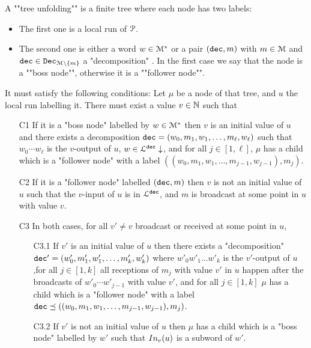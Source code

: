 \begin{definition}
	A ""tree unfolding"" is
	a finite tree where each node has two labels:
	\begin{itemize}
		\item The first one is a local run of $\mathcal{P}$. 
		
		\item The second one is either a word $w \in \mathcal{M}^*$ or a pair $(\mathtt{dec}, m)$ with $m \in \mathcal{M}$ and $\mathtt{dec} \in \mathtt{Dec}_{\mathcal{M}\setminus\{m\}}$ a "decomposition" . In the first case we say that the node is a ""boss node"", otherwise it is a ""follower node"". 
	\end{itemize} 
	
	It must satisfy the following conditions:
	Let $\mu$ be a node of that tree, and $u$ the local run labelling it. There must exist a value $v \in \mathbb{N}$ such that
	
	\begin{itemize}
		\item[C1] If it is a "boss node" labelled by $w \in \mathcal{M}^*$ then $v$ is an initial value of $u$ and there exists a decomposition $\mathtt{dec} = (w_0, m_1, w_1, \ldots, m_{\ell}, w_{\ell})$ such that
	 $w_0 \cdots w_\ell$ is the $v$-output of $u$, $w \in \mathcal{L}^{\mathtt{\mathtt{dec}}}\downarrow$, and for all $j \in [1,\ell]$, $\mu$ has a child which is a "follower node" with a label $((w_0, m_1, w_1, \ldots, m_{j-1}, w_{j-1}), m_j)$.
		
		\item[C2] If it is a "follower node" labelled $(\mathtt{dec}, m)$ then $v$ is not an initial value of $u$ such that the $v$-input of $u$ is in $\mathcal{L}^{\mathtt{\mathtt{dec}}}$, and $m$ is broadcast at some point in $u$ with value $v$.
		
		\item[C3] In both cases, for all $v' \neq v$ broadcast or received at some point in $u$,
		\begin{itemize}
			\item[C3.1] If $v'$ is an initial value of $u$ then there exists a "decomposition" $\mathtt{dec}' = (w'_0, m'_1, w'_1, \ldots, m'_k, w'_k)$ where $w'_0 w'_1 \ldots w'_k$ is the $v'$-output of $u$,for all $j \in [1,k]$ all receptions of $m_j$ with value $v'$ in $u$ happen after the broadcasts of $w'_0\cdots w'_{j-1}$ with value $v'$, and for all $j \in [1,k]$ $\mu$ has a child which is a "follower node" with a label $\mathtt{dec} \preceq ((w_0, m_1, w_1, \ldots, m_{j-1}, w_{j-1}), m_j)$.  
			
			\item[C3.2] If $v'$ is not an initial value of $u$ then $\mu$ has a child which is a "boss node" labelled by $w'$ such that $In_{v}(u)$ is a subword of $w'$.
		\end{itemize}
	\end{itemize}
	
	
\end{definition}


